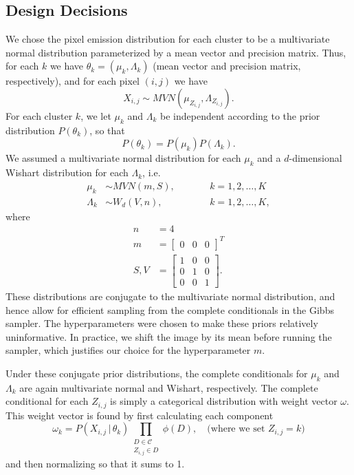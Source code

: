\documentclass[12pt]{article}
\begin{document}
\subsection*{Design Decisions}
We chose the pixel emission distribution for each cluster to be a multivariate normal
distribution parameterized by a mean vector and precision matrix.
Thus, for each $k$ we have $\theta_k = (\mu_k, \Lambda_k)$ (mean vector and precision matrix,
respectively), and for each pixel $(i,j)$
we have
\[
X_{i,j} \sim MVN(\mu_{Z_{i,j}}, \Lambda_{Z_{i,j}}).
\]
For each cluster $k$, we let $\mu_k$ and $\Lambda_k$ be independent according
to the prior distribution $P(\theta_k)$, so that
\[
P(\theta_k) = P(\mu_k)P(\Lambda_k).
\]
We assumed a multivariate normal distribution for each $\mu_k$ and a
$d$-dimensional Wishart distribution for each $\Lambda_k$, i.e.
\begin{align*}
\mu_k &\sim MVN(m,S), \qquad && k=1,2,\ldots,K\\
\Lambda_k &\sim W_d(V,n), &&k=1,2,\ldots,K,
\end{align*}
where
\begin{align*}
n &= 4\\
m &= \begin{bmatrix}
0 & 0 & 0
\end{bmatrix}^T\\
S, V &= \begin{bmatrix}
1 & 0 & 0\\
0 & 1 & 0\\
0 & 0 & 1
\end{bmatrix}.
\end{align*}
These distributions are conjugate to the multivariate normal distribution, and hence allow for
efficient sampling from the complete conditionals in the Gibbs sampler. The hyperparameters
were chosen to make these priors relatively uninformative.
In practice, we shift the image by its mean before running the sampler,
which justifies our choice for the hyperparameter $m$.

Under these conjugate prior distributions, the complete conditionals for $\mu_k$ and $\Lambda_k$
are again multivariate normal and Wishart, respectively.
The complete conditional for each $Z_{i,j}$ is simply a categorical distribution with weight
vector $\omega$. This weight vector is found by first calculating each component
\[
\omega_k = P(X_{i,j}\,|\,\theta_k)
\prod_{\substack{D \in \mathcal{C}\\
        Z_{i,j} \in D}}\phi(D), \quad \text{(where we set $Z_{i,j}=k$)}
\]
and then normalizing so that it sums to 1.
\end{document}
